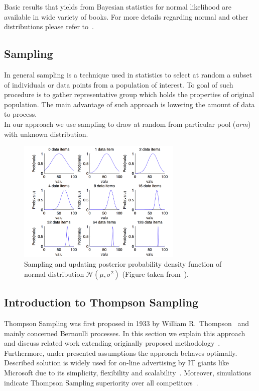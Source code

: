 \documentclass[12pt, a4paper, pdflatex, leqno]{report}
\begin{document}
Basic results that yields from Bayesian statistics for normal likelihood are available in wide variety of books. For more details regarding normal and other distributions please refer to~\citep{lynch2007introduction}\citep{gelman2003bayesian}.\\

\subsection{Sampling}
In general sampling is a technique used in statistics to select at random a subset of individuals or data points from a population of interest. To goal of such procedure is to gather representative group which holds the properties of original population. The main advantage of such approach is lowering the amount of data to process.\\
In our approach we use sampling to draw at random from particular pool (\emph{arm}) with unknown distribution.


\begin{figure}[htbp]
\centering
\includegraphics[width=0.7\textwidth]{graphics/sampling.png}
\begin{tiny}
\caption{Sampling and updating posterior probability density function of normal distribution $\mathcal{N}\left( \mu , \sigma^2 \right)$ (Figure taken from~\citep{Jacobs2008normalnormal}).\label{fig:sampling}}
\end{tiny}
\vspace{1cm}
\end{figure}


\subsection{Introduction to Thompson Sampling\label{sec:thompson}}
Thompson Sampling was first proposed in 1933 by William R.\ Thompson~\citep{thompson:biom33} and mainly concerned Bernoulli processes. In this section we explain this approach and discuss related work extending originally proposed methodology~\citep{May:2012:OBS:2503308.2343711}. Furthermore, under presented assumptions the approach behaves optimally.\\
Described solution is widely used for on-line advertising by IT giants like Microsoft due to its simplicity, flexibility and scalability~\citep{graepel2010web}. Moreover, simulations indicate Thompson Sampling superiority over all competitors~\citep{May:simulation}.\\
\end{document}
